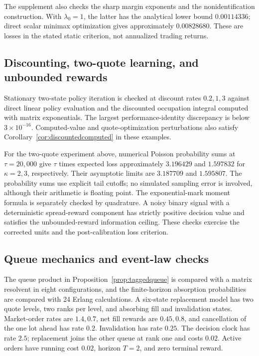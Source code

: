 \documentclass[11pt]{article}
\theoremstyle{plain}
\theoremstyle{definition}
\theoremstyle{remark}
\begin{document}
The supplement also checks the sharp margin exponents and the
nonidentification construction. With \(\lambda_0=1\), the latter
has the analytical lower bound \(0.00114336\); direct scalar
minimax optimization gives approximately \(0.00828680\).
These are losses in the stated static criterion, not annualized
trading returns.

\subsection{Discounting, two-quote learning, and unbounded rewards}

Stationary two-state policy iteration is checked at discount rates
\(0.2,1,3\) against direct linear policy evaluation and the discounted
occupation integral computed with matrix exponentials. The largest
performance-identity discrepancy is below \(3\times10^{-16}\).
Computed-value and quote-optimization perturbations also satisfy
Corollary~\ref{cor:discountedcomputed} in these examples.

For the two-quote experiment above, numerical Poisson probability sums
at \(\tau=20{,}000\) give \(\tau\) times expected loss approximately
\(3.196429\) and \(1.597832\) for \(\kappa=2,3\), respectively.
Their asymptotic limits are \(3.187709\) and \(1.595807\).
The probability sums use explicit tail cutoffs; no simulated sampling
error is involved, although their arithmetic is floating point.
The exponential-mark moment formula is separately checked by quadrature.
A noisy binary signal with a deterministic spread-reward component
has strictly positive decision value and satisfies the unbounded-reward
information ceiling. These checks exercise the corrected units and the
post-calibration loss criterion.

\subsection{Queue mechanics and event-law checks}

The queue product in Proposition~\ref{prop:taggedqueue} is compared
with a matrix resolvent in eight configurations, and the finite-horizon
absorption probabilities are compared with 24 Erlang calculations.
A six-state replacement model has two quote levels, two ranks per
level, and absorbing fill and invalidation states. Market-order rates
are \(1.4,0.7\), net fill rewards are \(0.45,0.8\), and cancellation
of the one lot ahead has rate \(0.2\). Invalidation has rate \(0.25\).
The decision clock has rate \(2.5\); replacement joins the other
queue at rank one and costs \(0.02\). Active orders have running
cost \(0.02\), horizon \(T=2\), and zero terminal reward.
\end{document}
